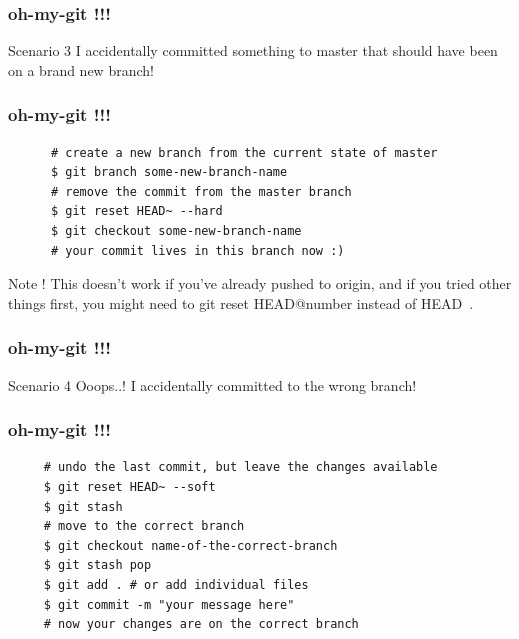 \documentclass[10pt]{beamer}
\begin{document}
\begin{frame}
  \frametitle{oh-my-git !!!}
  \begin{alertblock}{Scenario 3}
   I accidentally committed something to master that should have been on a brand new branch!
  \end{alertblock}
\end{frame}

\begin{frame}[fragile]
  \frametitle{oh-my-git !!!}
  \begin{example}[Solution]
    \begin{verbatim}
      # create a new branch from the current state of master
      $ git branch some-new-branch-name
      # remove the commit from the master branch
      $ git reset HEAD~ --hard
      $ git checkout some-new-branch-name
      # your commit lives in this branch now :)
    \end{verbatim}
  \end{example}
  \pause
  \begin{block}{Note !}
    This doesn't work if you've already pushed to origin, and if you tried other things first,
    you might need to git reset HEAD@{number} instead of HEAD~.
  \end{block}
\end{frame}

\begin{frame}
  \frametitle{oh-my-git !!!}
  \begin{alertblock}{Scenario 4}
   Ooops..! I accidentally committed to the wrong branch!
  \end{alertblock}
\end{frame}

\begin{frame}[fragile]
  \frametitle{oh-my-git !!!}
  \begin{example}[Solution]
    \begin{verbatim}
     # undo the last commit, but leave the changes available
     $ git reset HEAD~ --soft
     $ git stash
     # move to the correct branch
     $ git checkout name-of-the-correct-branch
     $ git stash pop
     $ git add . # or add individual files
     $ git commit -m "your message here"
     # now your changes are on the correct branch
    \end{verbatim}
  \end{example}
\end{frame}
\end{document}
